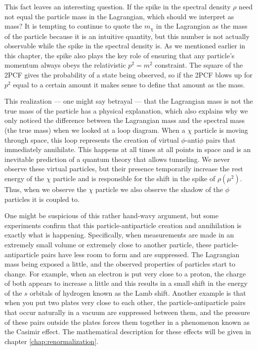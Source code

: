 This fact leaves an interesting question. If the spike in the spectral density $\rho$ need not equal the particle mass in the Lagrangian, which should we interpret as mass? It is tempting to continue to quote the $m_\chi$ in the Lagrangian as the mass of the particle because it is an intuitive quantity, but this number is not actually observable while the spike in the spectral density is. As we mentioned earlier in this chapter, the spike also plays the key role of ensuring that any particle's momentum always obeys the relativistic $p^2 = m^2$ constraint. The square of the 2PCF gives the probability of a state being observed, so if the 2PCF blows up for $p^2$ equal to a certain amount it makes sense to define that amount as the mass.

This realization --- one might say betrayal --- that the Lagrangian mass is not the true mass of the particle has a physical explanation, which also explains why we only noticed the difference between the Lagrangian mass and the spectral mass (the true mass) when we looked at a loop diagram. When a $\chi$ particle is moving through space, this loop represents the creation of virtual $\phi$-anti$\phi$ pairs that immediately annihilate. This happens at all times at all points in space and is an inevitable prediction of a quantum theory that allows tunneling. We never observe these virtual particles, but their presence temporarily increase the rest energy of the $\chi$ particle and is responsible for the shift in the spike of $\rho(\mu^2)$. Thus, when we observe the $\chi$ particle we also observe the shadow of the $\phi$ particles it is coupled to.

One might be suspicious of this rather hand-wavy argument, but some experiments confirm that this particle-antiparticle creation and annihilation is exactly what is happening. Specifically, when measurements are made in an extremely small volume or extremely close to another particle, these particle-antiparticle pairs have less room to form and are suppressed. The Lagrangian mass being exposed a little, and the observed properties of particles start to change. For example, when an electron is put very close to a proton, the charge of both appears to increase a little and this results in a small shift in the energy of the $s$ orbitals of hydrogen known as the Lamb shift. Another example is that when you put two plates very close to each other, the particle-antiparticle pairs that occur naturally in a vacuum are suppressed between them, and the pressure of these pairs outside the plates forces them together in a phenomenon known as the Casimir effect. The mathematical description for these effects will be given in chapter \ref{chap:renormalization}.

